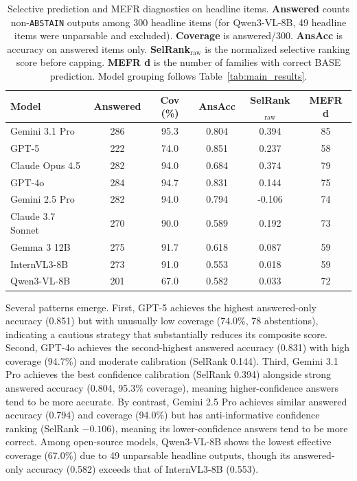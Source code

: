 \documentclass[11pt]{article}
\begin{document}
\begin{table}[t]
\centering
\small
\setlength{\tabcolsep}{5pt}
\caption{Selective prediction and MEFR diagnostics on headline items. \textbf{Answered} counts non-\texttt{ABSTAIN} outputs among 300 headline items (for Qwen3-VL-8B, 49 headline items were unparsable and excluded). \textbf{Coverage} is answered/300. \textbf{AnsAcc} is accuracy on answered items only. \textbf{SelRank$_{\text{raw}}$} is the normalized selective ranking score before capping. \textbf{MEFR d} is the number of families with correct BASE prediction. Model grouping follows Table~\ref{tab:main_results}.}
\label{tab:selective_diag}
\begin{tabular}{l
S[table-format=3.0]
S[table-format=2.1]
S[table-format=1.3]
S[table-format=2.3]
S[table-format=2.0]
}
\toprule
\textbf{Model} & {\textbf{Answered}} & {\textbf{Cov (\%)}} & {\textbf{AnsAcc}} & {\textbf{SelRank$_{\text{raw}}$}} & {\textbf{MEFR d}} \\
\midrule
Gemini 3.1 Pro    & 286 & 95.3 & 0.804 &  0.394 & 85 \\
GPT-5             & 222 & 74.0 & 0.851 &  0.237 & 58 \\
Claude Opus 4.5   & 282 & 94.0 & 0.684 &  0.374 & 79 \\
\midrule
GPT-4o            & 284 & 94.7 & 0.831 &  0.144 & 75 \\
Gemini 2.5 Pro    & 282 & 94.0 & 0.794 & -0.106 & 74 \\
Claude 3.7 Sonnet & 270 & 90.0 & 0.589 &  0.192 & 73 \\
\midrule
Gemma 3 12B       & 275 & 91.7 & 0.618 &  0.087 & 59 \\
InternVL3-8B      & 273 & 91.0 & 0.553 &  0.018 & 59 \\
Qwen3-VL-8B      & 201 & 67.0 & 0.582 &  0.033 & 72 \\
\bottomrule
\end{tabular}
\end{table}

Several patterns emerge. First, GPT-5 achieves the highest answered-only accuracy (0.851) but with unusually low coverage (74.0\%, 78 abstentions), indicating a cautious strategy that substantially reduces its composite score. Second, GPT-4o achieves the second-highest answered accuracy (0.831) with high coverage (94.7\%) and moderate calibration (SelRank 0.144). Third, Gemini 3.1 Pro achieves the best confidence calibration (SelRank 0.394) alongside strong answered accuracy (0.804, 95.3\% coverage), meaning higher-confidence answers tend to be more accurate. By contrast, Gemini 2.5 Pro achieves similar answered accuracy (0.794) and coverage (94.0\%) but has anti-informative confidence ranking (SelRank $-0.106$), meaning its lower-confidence answers tend to be more correct. Among open-source models, Qwen3-VL-8B shows the lowest effective coverage (67.0\%) due to 49 unparsable headline outputs, though its answered-only accuracy (0.582) exceeds that of InternVL3-8B (0.553).
\end{document}

